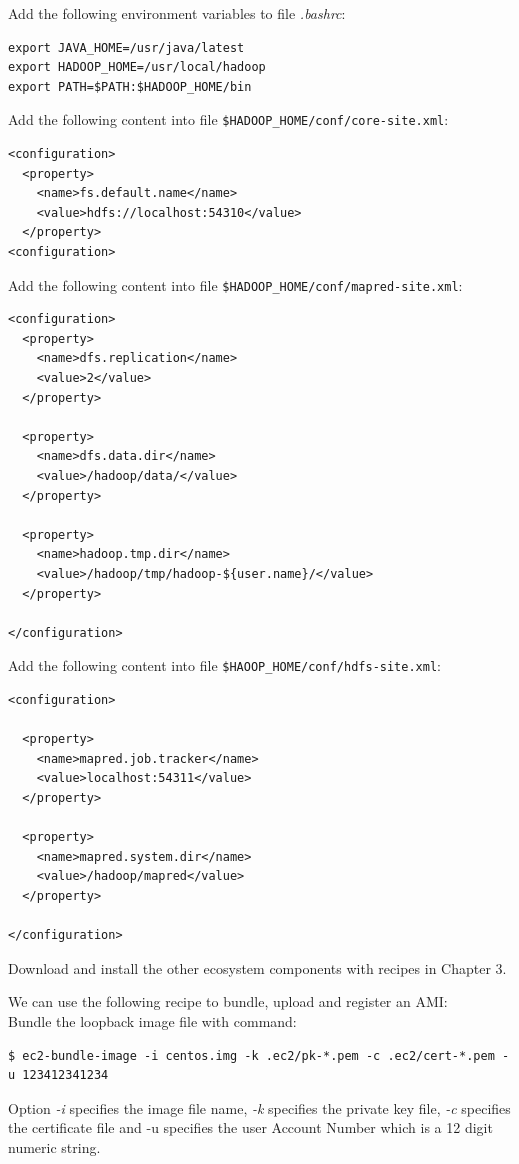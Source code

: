 Add the following environment variables to file \emph{.bashrc}:
\lstset{style=bashstyle}
\begin{lstlisting}
export JAVA_HOME=/usr/java/latest
export HADOOP_HOME=/usr/local/hadoop
export PATH=$PATH:$HADOOP_HOME/bin
\end{lstlisting}

Add the following content into file \verb|$HADOOP_HOME/conf/core-site.xml|:
\lstset{style=bashstyle}
\begin{lstlisting}
<configuration>
  <property>
    <name>fs.default.name</name>
    <value>hdfs://localhost:54310</value>
  </property>
<configuration>
\end{lstlisting}


Add the following content into file \verb|$HADOOP_HOME/conf/mapred-site.xml|:
\lstset{style=bashstyle}
\begin{lstlisting}
<configuration>
  <property>
    <name>dfs.replication</name>
    <value>2</value>
  </property>

  <property>
    <name>dfs.data.dir</name>
    <value>/hadoop/data/</value>
  </property>

  <property>
    <name>hadoop.tmp.dir</name>
    <value>/hadoop/tmp/hadoop-${user.name}/</value>
  </property>

</configuration>
\end{lstlisting}


Add the following content into file \verb|$HAOOP_HOME/conf/hdfs-site.xml|:
\lstset{style=bashstyle}
\begin{lstlisting}
<configuration>

  <property>
    <name>mapred.job.tracker</name>
    <value>localhost:54311</value>
  </property>

  <property>
    <name>mapred.system.dir</name>
    <value>/hadoop/mapred</value>
  </property>

</configuration>
\end{lstlisting}

Download and install the other ecosystem components with recipes in Chapter 3.

We can use the following recipe to bundle, upload and register an AMI: \\
Bundle the loopback image file with command:
\lstset{style=bashstyle}
\begin{lstlisting}
$ ec2-bundle-image -i centos.img -k .ec2/pk-*.pem -c .ec2/cert-*.pem -u 123412341234
\end{lstlisting}

Option \emph{-i} specifies the image file name, \emph{-k} specifies the private key file, \emph{-c} specifies the certificate file and -u specifies the user Account Number which is a 12 digit numeric string.

